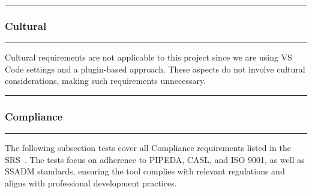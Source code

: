 \documentclass[12pt, titlepage]{article}
\newcommand{\colorrule}{\textcolor{BlueViolet}{\rule{\linewidth}{2pt}}}
\begin{document}
\begin{enumerate}[label={\bf \textcolor{Maroon}{test-SRT-\arabic*}}, wide=0pt, font=\itshape]
\newpage

\noindent
\colorrule

\subsubsection{Cultural}
\colorrule

\medskip

\noindent
Cultural requirements are not applicable to this project since we are using VS Code settings and a plugin-based approach. These aspects do not involve cultural considerations, making such requirements unnecessary.

\newpage

\noindent
\colorrule

\subsubsection{Compliance}
\colorrule

\medskip

\noindent
The following subsection tests cover all Compliance requirements listed in the SRS~\cite{SRS}. The tests focus on adherence to PIPEDA, CASL, and ISO 9001, as well as SSADM standards, ensuring the tool complies with relevant regulations and aligns with professional development practices.


\end{enumerate}
\end{document}
